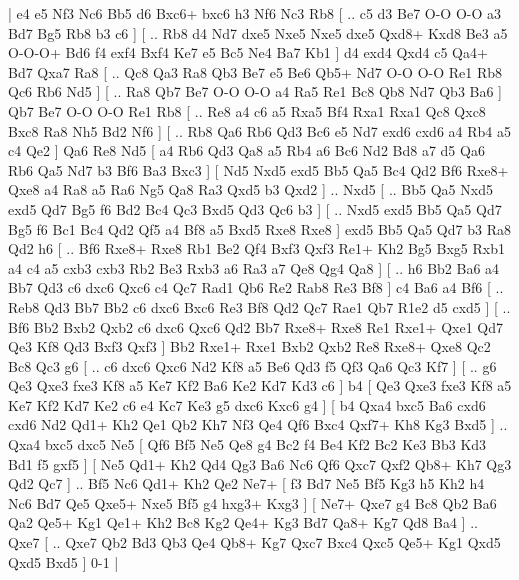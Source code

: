 \makegametitle 
|   e4   e5    Nf3   Nc6    Bb5   d6    Bxc6+   bxc6    h3   Nf6    Nc3   Rb8 [ .. c5  d3 Be7  O-O O-O  a3 Bd7  Bg5 Rb8  b3 c6   ]  [ .. Rb8  d4 Nd7  dxe5 Nxe5  Nxe5 dxe5  Qxd8+ Kxd8  Be3 a5  O-O-O+ Bd6  f4 exf4  Bxf4 Ke7  e5 Bc5  Ne4 Ba7  Kb1   ]  d4   exd4    Qxd4   c5    Qa4+   Bd7    Qxa7   Ra8 [ .. Qc8  Qa3 Ra8  Qb3 Be7  e5 Be6  Qb5+ Nd7  O-O O-O  Re1 Rb8  Qc6 Rb6  Nd5   ]  [ .. Ra8  Qb7 Be7  O-O O-O  a4 Ra5  Re1 Bc8  Qb8 Nd7  Qb3 Ba6   ]  Qb7   Be7    O-O   O-O    Re1   Rb8    [ .. Re8  a4 c6  a5 Rxa5  Bf4 Rxa1  Rxa1 Qc8  Qxc8 Bxc8  Ra8 Nh5  Bd2 Nf6   ]  [ .. Rb8  Qa6 Rb6  Qd3 Bc6  e5 Nd7  exd6 cxd6  a4 Rb4  a5 c4  Qe2   ]  Qa6   Re8    Nd5 [  a4 Rb6  Qd3 Qa8  a5 Rb4  a6 Bc6  Nd2 Bd8  a7 d5  Qa6 Rb6  Qa5 Nd7  b3 Bf6  Ba3 Bxc3   ]  [  Nd5 Nxd5  exd5 Bb5  Qa5 Bc4  Qd2 Bf6  Rxe8+ Qxe8  a4 Ra8  a5 Ra6  Ng5 Qa8  Ra3 Qxd5  b3 Qxd2   ] .. Nxd5    [ .. Bb5  Qa5 Nxd5  exd5 Qd7  Bg5 f6  Bd2 Bc4  Qc3 Bxd5  Qd3 Qc6  b3   ]  [ .. Nxd5  exd5 Bb5  Qa5 Qd7  Bg5 f6  Bc1 Bc4  Qd2 Qf5  a4 Bf8  a5 Bxd5  Rxe8 Rxe8   ]  exd5   Bb5    Qa5   Qd7    b3   Ra8    Qd2   h6 [ .. Bf6  Rxe8+ Rxe8  Rb1 Be2  Qf4 Bxf3  Qxf3 Re1+  Kh2 Bg5  Bxg5 Rxb1  a4 c4  a5 cxb3  cxb3 Rb2  Be3 Rxb3  a6 Ra3  a7 Qe8  Qg4 Qa8   ]  [ .. h6  Bb2 Ba6  a4 Bb7  Qd3 c6  dxc6 Qxc6  c4 Qc7  Rad1 Qb6  Re2 Rab8  Re3 Bf8   ]  c4   Ba6    a4   Bf6 [ .. Reb8  Qd3 Bb7  Bb2 c6  dxc6 Bxc6  Re3 Bf8  Qd2 Qc7  Rae1 Qb7  R1e2 d5  cxd5   ]  [ .. Bf6  Bb2 Bxb2  Qxb2 c6  dxc6 Qxc6  Qd2 Bb7  Rxe8+ Rxe8  Re1 Rxe1+  Qxe1 Qd7  Qe3 Kf8  Qd3 Bxf3  Qxf3   ]  Bb2   Rxe1+    Rxe1   Bxb2    Qxb2   Re8    Rxe8+   Qxe8    Qc2   Bc8    Qc3   g6 [ .. c6  dxc6 Qxc6  Nd2 Kf8  a5 Be6  Qd3 f5  Qf3 Qa6  Qc3 Kf7   ]  [ .. g6  Qe3 Qxe3  fxe3 Kf8  a5 Ke7  Kf2 Ba6  Ke2 Kd7  Kd3 c6   ]  b4 [  Qe3 Qxe3  fxe3 Kf8  a5 Ke7  Kf2 Kd7  Ke2 c6  e4 Kc7  Ke3 g5  dxc6 Kxc6  g4   ]  [  b4 Qxa4  bxc5 Ba6  cxd6 cxd6  Nd2 Qd1+  Kh2 Qe1  Qb2 Kh7  Nf3 Qe4  Qf6 Bxc4  Qxf7+ Kh8  Kg3 Bxd5   ] .. Qxa4    bxc5   dxc5    Ne5 [  Qf6 Bf5  Ne5 Qe8  g4 Bc2  f4 Be4  Kf2 Bc2  Ke3 Bb3  Kd3 Bd1  f5 gxf5   ]  [  Ne5 Qd1+  Kh2 Qd4  Qg3 Ba6  Nc6 Qf6  Qxc7 Qxf2  Qb8+ Kh7  Qg3 Qd2  Qc7   ] .. Bf5    Nc6   Qd1+    Kh2   Qe2    Ne7+ [  f3 Bd7  Ne5 Bf5  Kg3 h5  Kh2 h4  Nc6 Bd7  Qe5 Qxe5+  Nxe5 Bf5  g4 hxg3+  Kxg3   ]  [  Ne7+ Qxe7  g4 Bc8  Qb2 Ba6  Qa2 Qe5+  Kg1 Qe1+  Kh2 Bc8  Kg2 Qe4+  Kg3 Bd7  Qa8+ Kg7  Qd8 Ba4   ] .. Qxe7    [ .. Qxe7  Qb2 Bd3  Qb3 Qe4  Qb8+ Kg7  Qxc7 Bxc4  Qxc5 Qe5+  Kg1 Qxd5  Qxd5 Bxd5   ] 0-1  |
